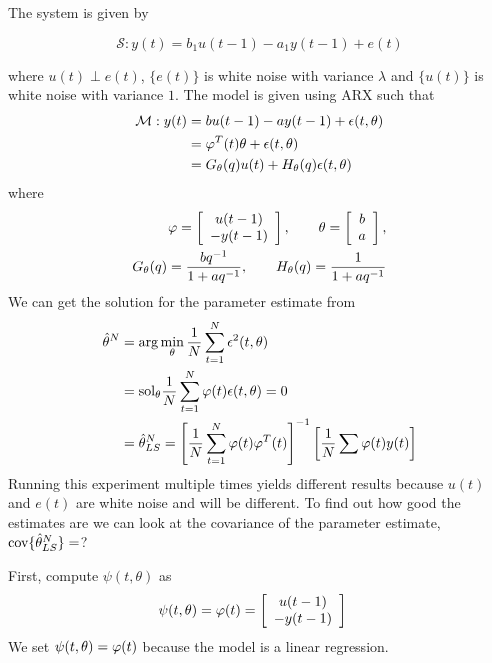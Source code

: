 \begin{example}%
\label{ex:15arx}
The system is given by

\begin{equation*}
\mathcal{S}: y(t) = b_1u(t-1)-a_1y(t-1)+e(t)
\end{equation*}

where $u(t)\perp e(t)$, $\{e(t)\}$ is white noise with variance $\lambda$ and $\{u(t)\}$ is white noise with variance $1$.
The model is given using ARX such that
\begin{align*}
\mathcal{M}: y(t) &= bu(t-1)-ay(t-1)+\epsilon(t,\theta) \\
&= \varphi^T(t)\theta+\epsilon(t,\theta) \\
&= G_\theta(q)u(t) + H_\theta(q)\epsilon(t,\theta)
\end{align*}
where
\begin{align*}
\varphi = \left[\begin{array}{c} u(t-1) \\ -y(t-1) \end{array}\right], \qquad \theta= \left[\begin{array}{c} b \\ a \end{array}\right], \\ G_\theta(q) = \frac{bq^{-1}}{1+aq^{-1}}, \qquad H_\theta(q) = \frac{1}{1+aq^{-1}}
\end{align*}
We can get the solution for the parameter estimate from
\begin{align*}
\hat{\theta}^N &= \arg\min_\theta\frac{1}{N}\sum_{t=1}^N\epsilon^2(t,\theta) \\
&= \text{sol}_\theta\frac{1}{N}\sum_{t=1}^N\varphi(t)\epsilon(t,\theta) = 0 \\
&= \hat{\theta}_{LS}^N = {\left[\frac{1}{N}\sum_{t=1}^N\varphi(t)\varphi^T(t)\right]}^{-1}\left[\frac{1}{N}\sum\varphi(t)y(t)\right]
\end{align*}
Running this experiment multiple times yields different results because $u(t)$ and $e(t)$ are white noise and will be different.
To find out how good the estimates are we can look at the covariance of the parameter estimate, $\text{cov}\{\hat{\theta}_{LS}^N\}=$?

First, compute $\psi(t,\theta)$ as
\begin{align*}
\psi(t,\theta) &= \varphi(t) = \left[\begin{array}{c} u(t-1) \\ -y(t-1) \end{array}\right]
\end{align*}
We set $\psi(t,\theta)=\varphi(t)$ because the model is a linear regression.


\end{example}
